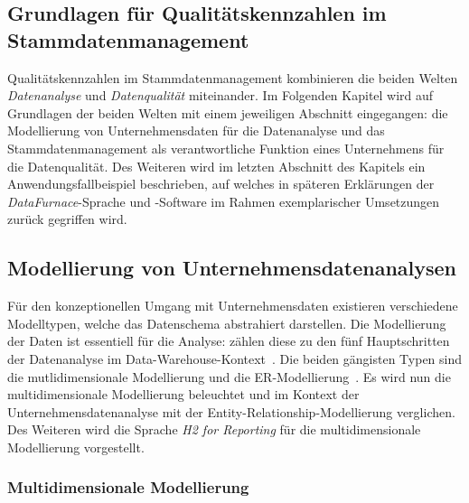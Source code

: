 \documentclass[
  language=german, %
  type=bachelor,%
  ngerman
]{isthesis}
\begin{document}
\begin{content}
  \chapter{Grundlagen für Qualitätskennzahlen im Stammdatenmanagement}\label{ch:grundlagen}
  

  Qualitätskennzahlen im Stammdatenmanagement kombinieren die
  beiden Welten \textit{Datenanalyse} und \textit{Datenqualität} miteinander.
  Im Folgenden Kapitel wird auf Grundlagen der beiden Welten mit einem
  jeweiligen Abschnitt eingegangen: die Modellierung von Unternehmensdaten für die
  Datenanalyse und das Stammdatenmanagement als verantwortliche Funktion eines
  Unternehmens für die Datenqualität. Des Weiteren wird im letzten Abschnitt des
  Kapitels ein Anwendungsfallbeispiel beschrieben, auf welches in späteren
  Erklärungen der \textit{DataFurnace}-Sprache und -Software im Rahmen
  exemplarischer Umsetzungen zurück gegriffen wird.

  \section{Modellierung von Unternehmensdatenanalysen}\label{sec:modellierung}

  Für den konzeptionellen Umgang mit Unternehmensdaten existieren verschiedene
  Modelltypen, welche das Datenschema abstrahiert darstellen.  Die Modellierung
  der Daten ist essentiell für die Analyse:
  \textsc{\citeauthor{phipps2002automating}} zählen diese zu den fünf
  Hauptschritten der Datenanalyse im Data-Warehouse-Kontext~\cite[][S.
  1]{phipps2002automating}. Die beiden gängisten Typen sind die
  mutlidimensionale Modellierung und die \acrlong{ER}-Modellierung~\cite[][S.
  36]{ballard1998data}. Es wird nun die multidimensionale Modellierung
  beleuchtet und im Kontext der Unternehmensdatenanalyse mit der
  Entity-Relationship-Modellierung verglichen. Des Weiteren wird die Sprache
  \textit{H2 for Reporting} für die multidimensionale Modellierung vorgestellt.


  \subsection{Multidimensionale
  Modellierung}\label{subsec:multidimensionale-modellierung} 


\end{content}
\end{document}
